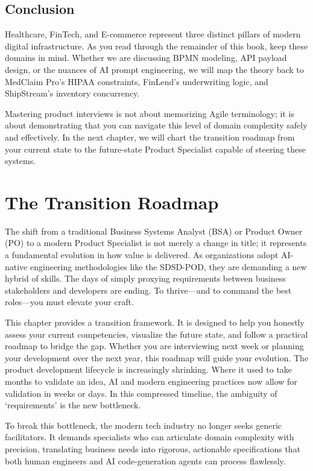 \documentclass[
  11pt,
  openany,
  oneside]{book}
\begin{document}
\bigskip

\section{Conclusion}\label{conclusion}

Healthcare, FinTech, and E-commerce represent three distinct pillars of
modern digital infrastructure. As you read through the remainder of this
book, keep these domains in mind. Whether we are discussing BPMN
modeling, API payload design, or the nuances of AI prompt engineering,
we will map the theory back to MedClaim Pro's HIPAA constraints,
FinLend's underwriting logic, and ShipStream's inventory concurrency.

Mastering product interviews is not about memorizing Agile terminology;
it is about demonstrating that you can navigate this level of domain
complexity safely and effectively. In the next chapter, we will chart
the transition roadmap from your current state to the future-state
Product Specialist capable of steering these systems.

\chapter{The Transition Roadmap}\label{the-transition-roadmap}

The shift from a traditional Business Systems Analyst (BSA) or Product
Owner (PO) to a modern Product Specialist is not merely a change in
title; it represents a fundamental evolution in how value is delivered.
As organizations adopt AI-native engineering methodologies like the
SDSD-POD, they are demanding a new hybrid of skills. The days of simply
proxying requirements between business stakeholders and developers are
ending. To thrive---and to command the best roles---you must elevate
your craft.

This chapter provides a transition framework. It is designed to help you
honestly assess your current competencies, visualize the future state,
and follow a practical roadmap to bridge the gap. Whether you are
interviewing next week or planning your development over the next year,
this roadmap will guide your evolution. The product development
lifecycle is increasingly shrinking. Where it used to take months to
validate an idea, AI and modern engineering practices now allow for
validation in weeks or days. In this compressed timeline, the ambiguity
of `requirements' is the new bottleneck.

To break this bottleneck, the modern tech industry no longer seeks
generic facilitators. It demands specialists who can articulate domain
complexity with precision, translating business needs into rigorous,
actionable specifications that both human engineers and AI
code-generation agents can process flawlessly.
\end{document}

